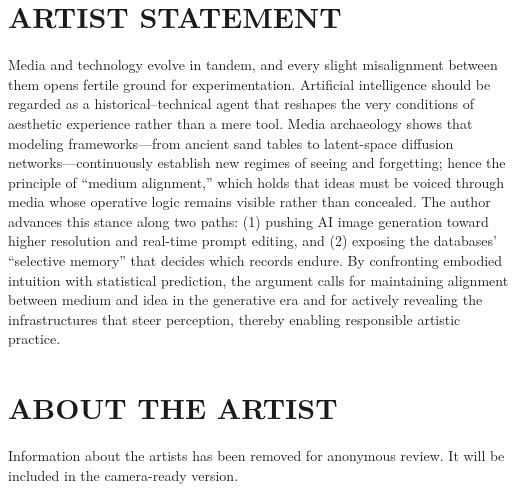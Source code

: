 \documentclass[sigconf]{acmart} %
\begin{document}
\section{ARTIST STATEMENT}
Media and technology evolve in tandem, and every slight misalignment between them opens fertile ground for experimentation. Artificial intelligence should be regarded as a historical–technical agent that reshapes the very conditions of aesthetic experience rather than a mere tool. Media archaeology shows that modeling frameworks—from ancient sand tables to latent-space diffusion networks—continuously establish new regimes of seeing and forgetting; hence the principle of “medium alignment,” which holds that ideas must be voiced through media whose operative logic remains visible rather than concealed. The author advances this stance along two paths: (1) pushing AI image generation toward higher resolution and real-time prompt editing, and (2) exposing the databases’ “selective memory” that decides which records endure. By confronting embodied intuition with statistical prediction, the argument calls for maintaining alignment between medium and idea in the generative era and for actively revealing the infrastructures that steer perception, thereby enabling responsible artistic practice.

\ifanonymousmode
  \section{ABOUT THE ARTIST}
  Information about the artists has been removed for anonymous review.
  It will be included in the camera-ready version.
\else
\end{document}
